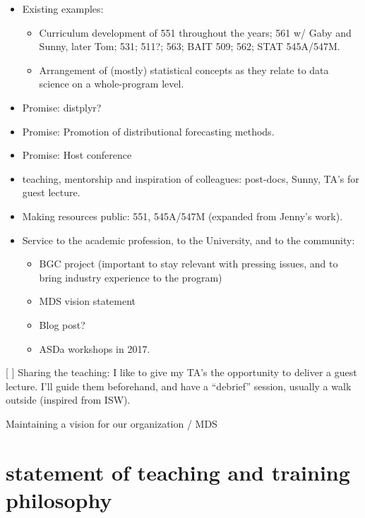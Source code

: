 \documentclass[]{book}
\providecommand{\tightlist}{%
  \setlength{\itemsep}{0pt}\setlength{\parskip}{0pt}}
\begin{document}
\begin{itemize}
\item
  Existing examples:

  \begin{itemize}
  \tightlist
  \item
    Curriculum development of 551 throughout the years; 561 w/ Gaby and Sunny, later Tom; 531; 511?; 563; BAIT 509; 562; STAT 545A/547M.
  \item
    Arrangement of (mostly) statistical concepts as they relate to data science on a whole-program level.
  \end{itemize}
\item
  Promise: distplyr?
\item
  Promise: Promotion of distributional forecasting methods.
\item
  Promise: Host conference
\item
  teaching, mentorship and inspiration of colleagues: post-docs, Sunny, TA's for guest lecture.
\item
  Making resources public: 551, 545A/547M (expanded from Jenny's work).
\item
  Service to the academic profession, to the University, and to the community:

  \begin{itemize}
  \tightlist
  \item
    BGC project (important to stay relevant with pressing issues, and to bring industry experience to the program)
  \item
    MDS vision statement
  \item
    Blog post?
  \item
    ASDa workshops in 2017.
  \end{itemize}
\end{itemize}

{[} {]} Sharing the teaching: I like to give my TA's the opportunity to deliver a guest lecture. I'll guide them beforehand, and have a ``debrief'' session, usually a walk outside (inspired from ISW).

Maintaining a vision for our organization / MDS

\hypertarget{statement-of-teaching-and-training-philosophy}{%
\chapter{statement of teaching and training philosophy}\label{statement-of-teaching-and-training-philosophy}}
\end{document}
